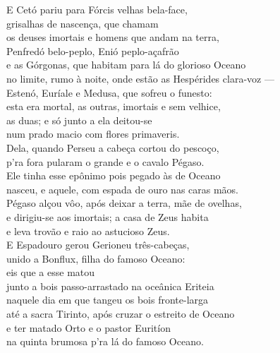 \begin{pages}
\begin{Rightside}
E Cetó pariu para Fórcis velhas bela-face,\\
grisalhas de nascença, que chamam \\
os deuses imortais e homens que andam na terra,\\
Penfredó belo-peplo, Enió peplo-açafrão\\
e as Górgonas, que habitam para lá do glorioso Oceano\\
no limite, rumo à noite, onde estão as Hespérides clara-voz --- \\
Estenó, Euríale e Medusa, que sofreu o funesto:\\
esta era mortal, as outras, imortais e sem velhice,\\
as duas; e só junto a ela deitou-se \\
num prado macio com flores primaveris.\\
Dela, quando Perseu a cabeça cortou do pescoço, \\
p'ra fora pularam o grande  e o cavalo Pégaso.\\
Ele tinha esse epônimo pois pegado às  de Oceano\\
nasceu, e aquele, com espada de ouro nas caras mãos.\\
Pégaso alçou vôo, após deixar a terra, mãe de ovelhas,\\
e dirigiu-se aos imortais; a casa de Zeus habita \\
e leva trovão e raio ao astucioso Zeus.\\
E Espadouro gerou Gerioneu três-cabeças,\\
unido a Bonflux, filha do famoso Oceano:\\
eis que a esse matou \\
junto a bois passo-arrastado na oceânica Eriteia \\
naquele dia em que tangeu os bois fronte-larga\\
até a sacra Tirinto, após cruzar o estreito de Oceano\\
e ter matado Orto e o pastor Euritíon\\
na quinta brumosa p'ra lá do famoso Oceano.\\


\end{Rightside}
\end{pages}
